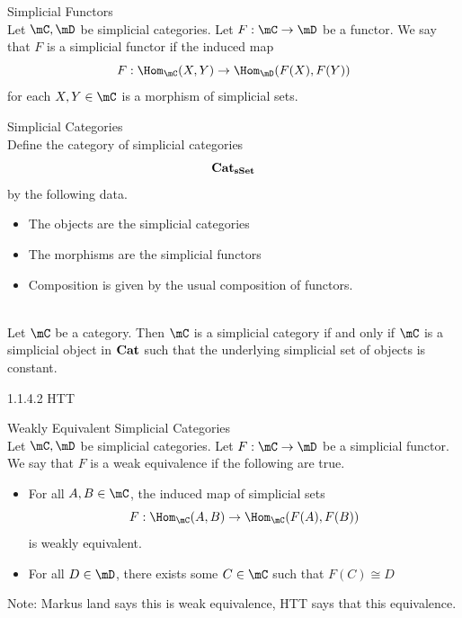 \documentclass[a4paper]{article}
\begin{document}
\begin{defn}{Simplicial Functors}{}\\ Let $\mC,\mD$ be simplicial categories. Let $F:\mC\to\mD$ be a functor. We say that $F$ is a simplicial functor if the induced map $$F:\Hom_\mC(X,Y)\to\Hom_\mD(F(X),F(Y))$$ for each $X,Y\in\mC$ is a morphism of simplicial sets. 
\end{defn}

\begin{defn}{Simplicial Categories}{}\\ Define the category of simplicial categories $$\bold{Cat}_\bold{sSet}$$ by the following data. 
\begin{itemize}
\item The objects are the simplicial categories
\item The morphisms are the simplicial functors
\item Composition is given by the usual composition of functors. 
\end{itemize}
\end{defn}

\begin{prp}{}{}\\ Let $\mC$ be a category. Then $\mC$ is a simplicial category if and only if $\mC$ is a simplicial object in $\bold{Cat}$ such that the underlying simplicial set of objects is constant. 
\end{prp}

1.1.4.2 HTT

\begin{defn}{Weakly Equivalent Simplicial Categories}{}\\ Let $\mC,\mD$ be simplicial categories. Let $F:\mC\to\mD$ be a simplicial functor. We say that $F$ is a weak equivalence if the following are true. 
\begin{itemize}
\item For all $A,B\in\mC$, the induced map of simplicial sets $$F:\Hom_\mC(A,B)\to\Hom_\mC(F(A),F(B))$$ is weakly equivalent. 
\item For all $D\in\mD$, there exists some $C\in\mC$ such that $F(C)\cong D$
\end{itemize}
\end{defn}

Note: Markus land says this is weak equivalence, HTT says that this equivalence. 
\end{document}
